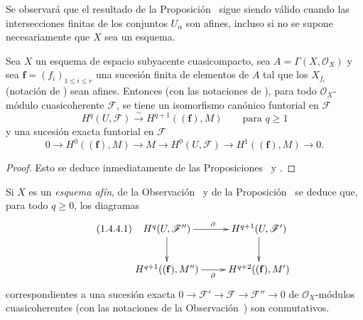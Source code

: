 \begin{remark}[1.4.2]
\label{III.1.4.2}
\label{III.1.4.2-fr}
Se observará que el resultado de la Proposición~ sigue siendo válido cuando las intersecciones finitas de los conjuntos $U_\alpha$ son afines, incluso si no se supone necesariamente que $X$ sea un esquema.
\end{remark}

\begin{corollary}[1.4.3]
\label{III.1.4.3}
\label{III.1.4.3-fr}
Sea $X$ un esquema de espacio subyacente cuasicompacto, sea $A=\Gamma(X,\mathcal O_X)$ y sea $\mathbf f=(f_i)_{1\leq i\leq r}$ una sucesión finita de elementos de $A$ tal que los $X_{f_i}$ (notación de \textup{}) sean afines.
Entonces (con las notaciones de \textup{}), para todo $\mathcal O_X$-módulo cuasicoherente $\mathcal F$, se tiene un isomorfismo canónico funtorial en $\mathcal F$
\begin{equation}
\label{III.1.4.3.1-fr}
\tag{1.4.3.1}
H^q(U,\mathcal F)\xrightarrow{\sim}H^{q+1}((\mathbf f),M)
\qquad\text{para }q\geq1
\end{equation}
y una sucesión exacta funtorial en $\mathcal F$
\begin{equation}
\label{III.1.4.3.2-fr}
\tag{1.4.3.2}
0\longrightarrow H^0((\mathbf f),M)\longrightarrow M
\longrightarrow H^0(U,\mathcal F)
\longrightarrow H^1((\mathbf f),M)\longrightarrow0.
\end{equation}
\end{corollary}

\begin{proof}
Esto se deduce inmediatamente de las Proposiciones~ y .
\end{proof}

\begin{env}[1.4.4]
\label{III.1.4.4}
\label{III.1.4.4-fr}
Si $X$ es un \emph{esquema afín}, de la Observación~ y de la Proposición~ se deduce que, para todo $q\geq0$, los diagramas
\begin{equation}
\label{III.1.4.4.1-fr}
\tag{1.4.4.1}
\xymatrix{
H^q(U,\mathcal F'')\ar[r]^{\partial}\ar[d]
&H^{q+1}(U,\mathcal F')\ar[d]\\
H^{q+1}((\mathbf f),M'')\ar[r]_{\partial}
&H^{q+2}((\mathbf f),M')
}
\end{equation}
correspondientes a una sucesión exacta $0\to\mathcal F'\to\mathcal F\to\mathcal F''\to0$ de $\mathcal O_X$-módulos cuasicoherentes (con las notaciones de la Observación~) son conmutativos.
\end{env}

